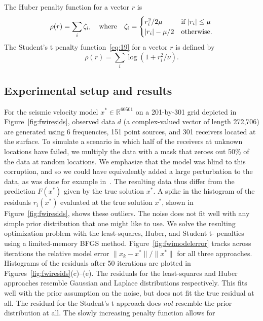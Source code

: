 \documentclass[nospthms]{svjour3}
\numberwithin{equation}{section}
\def\text #1{\hbox{\quad#1\quad}}
\def\xstar{x^*}
\begin{document}
The Huber penalty function for a vector $r$ is
\begin{equation*}
 \rho(r) = \sum_i \zeta_i,
 \text{where}
 \zeta_i = \begin{cases}
      r_i^2/{2\mu} & \hbox{if $|r_i|\leq \mu$}
    \\|r_i|-\mu/2  & \hbox{otherwise.}
  \end{cases}
\end{equation*}
The Student's t penalty function~\eqref{eq:19} for a vector $r$ is
defined by
\[
 \rho(r)=\sum_i\log(1+r_i^2/\nu).
\]


\subsection{Experimental setup and results}

For the seismic velocity model $x^*\in \mathbb{R}^{60501}$ on a
201-by-301 grid depicted in
Figure~\ref{fig:fwiresids}, observed data
$d$ (a complex-valued vector of length 272,706) are generated using 6
frequencies, 151 point sources, and 301 receivers located at the
surface.  To simulate a scenario in which half of the receivers at
unknown locations have failed, we multiply the data with a mask that
zeroes out 50\% of the data at random locations. We emphasize that the
model was blind to this corruption, and so we could have equivalently
added a large perturbation to the data, as was done for example
in~\cite{AravkinLH:2011a}.  The resulting data thus differ from the
prediction $F(x^*)$ given by the true solution $\xstar$. A spike in
the histogram of the residuals $r_i(\xstar)$ evaluated at the true
solution $\xstar$, shown in
Figure~\ref{fig:fwiresids}, shows these
outliers. The noise does not fit well with any simple prior
distribution that one might like to use.
We solve the resulting optimization problem with the least-squares,
Huber, and Student t- penalties using a limited-memory BFGS
method. Figure~\ref{fig:fwimodelerror} tracks across iterations the
relative model error $\|x_k - x^*\|/\|x^*\|$ for all three
approaches. Histograms of the residuals after 50 iterations are
plotted in Figures~\ref{fig:fwiresids}(c)--(e). The residuals for the
least-squares and Huber approaches resemble Gaussian and Laplace
distributions respectively. This fits well with the prior assumption
on the noise, but does not fit the true residual at all. The residual
for the Student's t approach does \emph{not} resemble the prior
distribution at all. The slowly increasing penalty function allows for
\end{document}
